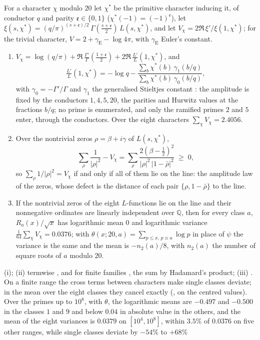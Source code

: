 \begin{proposition}\label{prop:closure-amplitude}
For a character $\chi$ modulo $20$ let $\chi^*$ be the primitive character inducing it, of
conductor $q$ and parity $\mathfrak e\in\{0,1\}$ ($\chi^*(-1)=(-1)^{\mathfrak e}$), let
$\xi(s,\chi^*)=(q/\pi)^{(s+\mathfrak e)/2}\,\Gamma(\tfrac{s+\mathfrak e}2)\,L(s,\chi^*)$, and let
$V_\chi=2\Re\,\xi'/\xi(1,\chi^*)$; for the trivial character, $V=2+\gamma_{\mathrm E}-\log4\pi$, with $\gamma_{\mathrm E}$
Euler's constant.
\begin{enumerate}[label=\textup{(\roman*)}]
  \item $V_\chi=\log(q/\pi)+\Re\,\tfrac{\Gamma'}{\Gamma}(\tfrac{1+\mathfrak e}2)
    +2\Re\,\tfrac{L'}{L}(1,\chi^*)$, and
    \[
      \tfrac{L'}{L}(1,\chi^*)=-\log q
      -\frac{\sum_b\chi^*(b)\,\gamma_1(b/q)}{\sum_b\chi^*(b)\,\gamma_0(b/q)},
    \]
    with $\gamma_0=-\Gamma'/\Gamma$ and $\gamma_1$ the generalised Stieltjes constant
    \cite{berndt72,dilcher92}: the amplitude is fixed by the conductors $1,4,5,20$, the parities
    and Hurwitz values at the fractions $b/q$; no prime is enumerated, and only the ramified primes
    $2$ and $5$ enter, through the conductors.  Over the eight characters
    $\sum_\chi V_\chi=2.4056$.
  \item Over the nontrivial zeros $\rho=\beta+i\gamma$ of $L(s,\chi^*)$,
    \[
      \sum_\rho\frac1{|\rho|^2}-V_\chi
      =\sum_\rho\frac{2(\beta-\frac12)^2}{|\rho|^2\,|1-\bar\rho|^2}\;\geq\;0,
    \]
    so $\sum_\rho1/|\rho|^2=V_\chi$ if and only if all of them lie on the line: the amplitude law
    of the zeros, whose defect is the distance of each pair $\{\rho,1-\bar\rho\}$ to the line.
  \item If the nontrivial zeros of the eight $L$-functions lie on the line and their nonnegative
    ordinates are linearly independent over $\mathbb{Q}$, then for every class $a$, $R_a(x)/\sqrt x$ has logarithmic
    mean $0$ and logarithmic variance $\tfrac1{64}\sum_\chi V_\chi=0.0376$; with
    $\theta(x;20,a)=\sum_{p\leq x,\,p\equiv a}\log p$ in place of $\psi$ the variance is the same and the mean is $-n_2(a)/8$, with $n_2(a)$ the number of square
    roots of $a$ modulo $20$.
\end{enumerate}
{\raggedright (i); (ii) termwise
, and for finite families
, the sum by Hadamard's product; (iii) \cite{rubinsteinsarnak94}.  On a
finite range the cross terms between characters make single classes deviate; in the mean over the
eight classes they cancel exactly (, on the
centred values).  Over the primes up to $10^8$, with $\theta$, the logarithmic means are $-0.497$
and $-0.500$ in the classes $1$ and $9$ and below $0.04$ in absolute value in the others, and the
mean of the eight variances is $0.0379$ on $[10^4,10^8]$, within $3.5\%$ of $0.0376$ on five other
ranges, while single classes deviate by $-54\%$ to $+68\%$
\par}
\end{proposition}

